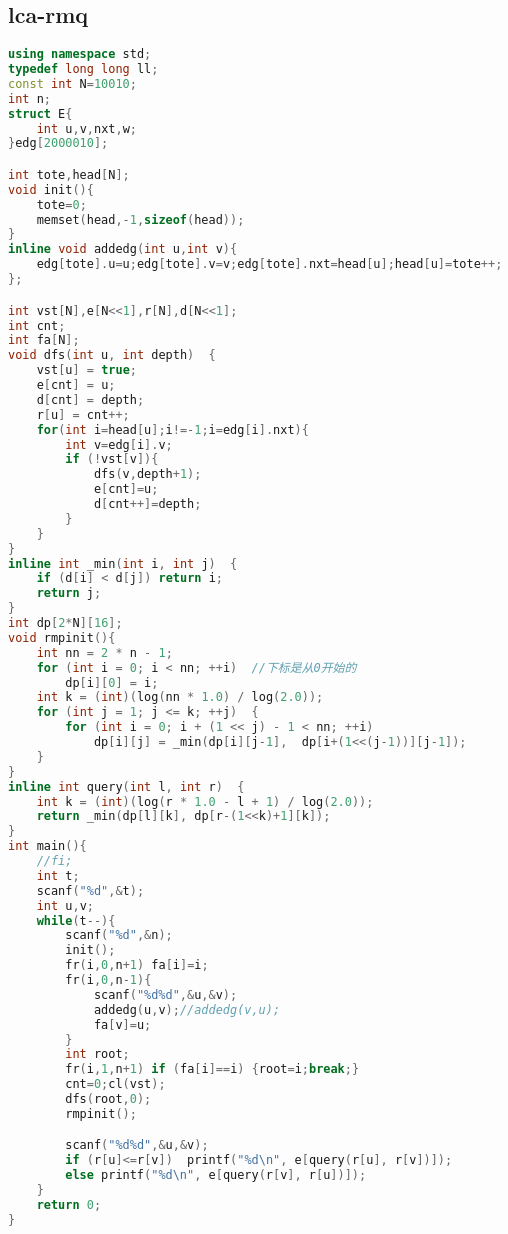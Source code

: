 \subsection{lca-rmq}
		\begin{lstlisting}[language=c++]
using namespace std;
typedef long long ll;
const int N=10010;
int n;
struct E{
	int u,v,nxt,w;
}edg[2000010];

int tote,head[N];
void init(){
	tote=0;
	memset(head,-1,sizeof(head));	
}
inline void addedg(int u,int v){
	edg[tote].u=u;edg[tote].v=v;edg[tote].nxt=head[u];head[u]=tote++;
};

int vst[N],e[N<<1],r[N],d[N<<1];
int cnt;
int fa[N];
void dfs(int u, int depth)  {  
	vst[u] = true;  
	e[cnt] = u;  
	d[cnt] = depth;  
	r[u] = cnt++;  
	for(int i=head[u];i!=-1;i=edg[i].nxt){
		int v=edg[i].v;
		if (!vst[v]){
			dfs(v,depth+1);
			e[cnt]=u;
			d[cnt++]=depth;
		}
	}
}  
inline int _min(int i, int j)  {  
	if (d[i] < d[j]) return i;  
	return j;  
}  
int dp[2*N][16];
void rmpinit(){
	int nn = 2 * n - 1;  
	for (int i = 0; i < nn; ++i)  //下标是从0开始的
		dp[i][0] = i;  
	int k = (int)(log(nn * 1.0) / log(2.0));  
	for (int j = 1; j <= k; ++j)  {  
		for (int i = 0; i + (1 << j) - 1 < nn; ++i)  
			dp[i][j] = _min(dp[i][j-1],  dp[i+(1<<(j-1))][j-1]);  
	}  
}
inline int query(int l, int r)  {  
	int k = (int)(log(r * 1.0 - l + 1) / log(2.0));  
	return _min(dp[l][k], dp[r-(1<<k)+1][k]);  
}  
int main(){
	//fi;
	int t;
	scanf("%d",&t);
	int u,v;
	while(t--){
		scanf("%d",&n);
		init();
		fr(i,0,n+1) fa[i]=i;
		fr(i,0,n-1){
			scanf("%d%d",&u,&v);
			addedg(u,v);//addedg(v,u);
			fa[v]=u;
		}
		int root;
		fr(i,1,n+1) if (fa[i]==i) {root=i;break;}
		cnt=0;cl(vst);
		dfs(root,0);
		rmpinit();

		scanf("%d%d",&u,&v);
		if (r[u]<=r[v])  printf("%d\n", e[query(r[u], r[v])]);
		else printf("%d\n", e[query(r[v], r[u])]);
	}
	return 0;
}
	\end{lstlisting}